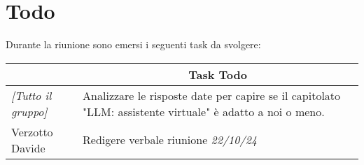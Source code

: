 \section{Todo}

Durante la riunione sono emersi i seguenti task da svolgere:

\vspace{0.5cm}

\begin{table}[htbp]
\begin{tabular}{|p{}|p{}|}
    \hline
    \rowcolor[gray]{0.9}
    \multicolumn{1}{|c|}{\textbf{Assegnatario}} & \multicolumn{1}{|c|}{\textbf{Task Todo}} \\
    \hline
    \emph{[Tutto il gruppo]} & Analizzare le risposte date per capire se il
capitolato "LLM: assistente virtuale" è adatto a noi o meno.  \\
    \hline
    Verzotto Davide & Redigere verbale riunione \emph{22/10/24} \\
    \hline
\end{tabular}
\end{table}
